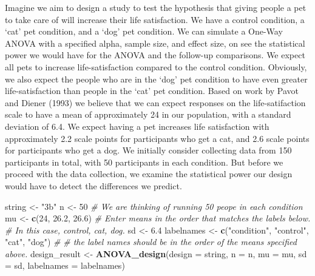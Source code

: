 \documentclass[]{book}
\newenvironment{Shaded}{\begin{snugshade}}{\end{snugshade}}
\newcommand{\CommentTok}[1]{\textcolor[rgb]{0.56,0.35,0.01}{\textit{#1}}}
\newcommand{\DataTypeTok}[1]{\textcolor[rgb]{0.13,0.29,0.53}{#1}}
\newcommand{\DecValTok}[1]{\textcolor[rgb]{0.00,0.00,0.81}{#1}}
\newcommand{\FloatTok}[1]{\textcolor[rgb]{0.00,0.00,0.81}{#1}}
\newcommand{\KeywordTok}[1]{\textcolor[rgb]{0.13,0.29,0.53}{\textbf{#1}}}
\newcommand{\NormalTok}[1]{#1}
\newcommand{\StringTok}[1]{\textcolor[rgb]{0.31,0.60,0.02}{#1}}
\begin{document}
Imagine we aim to design a study to test the hypothesis that giving people a pet to take care of will increase their life satisfaction. We have a control condition, a `cat' pet condition, and a `dog' pet condition. We can simulate a One-Way ANOVA with a specified alpha, sample size, and effect size, on see the statistical power we would have for the ANOVA and the follow-up comparisons. We expect all pets to increase life-satisfaction compared to the control condition. Obviously, we also expect the people who are in the `dog' pet condition to have even greater life-satisfaction than people in the `cat' pet condition. Based on work by Pavot and Diener (1993) we believe that we can expect responses on the life-satifaction scale to have a mean of approximately 24 in our population, with a standard deviation of 6.4. We expect having a pet increases life satisfaction with approximately 2.2 scale points for participants who get a cat, and 2.6 scale points for participants who get a dog. We initially consider collecting data from 150 participants in total, with 50 participants in each condition. But before we proceed with the data collection, we examine the statistical power our design would have to detect the differences we predict.

\begin{Shaded}
\begin{Highlighting}[]
\NormalTok{string <-}\StringTok{ "3b"}
\NormalTok{n <-}\StringTok{ }\DecValTok{50}
\CommentTok{# We are thinking of running 50 peope in each condition}
\NormalTok{mu <-}\StringTok{ }\KeywordTok{c}\NormalTok{(}\DecValTok{24}\NormalTok{, }\FloatTok{26.2}\NormalTok{, }\FloatTok{26.6}\NormalTok{)}
\CommentTok{# Enter means in the order that matches the labels below.}
\CommentTok{# In this case, control, cat, dog. }
\NormalTok{sd <-}\StringTok{ }\FloatTok{6.4}
\NormalTok{labelnames <-}\StringTok{ }\KeywordTok{c}\NormalTok{(}\StringTok{"condition"}\NormalTok{, }\StringTok{"control"}\NormalTok{, }\StringTok{"cat"}\NormalTok{, }\StringTok{"dog"}\NormalTok{) }\CommentTok{#}
\CommentTok{# the label names should be in the order of the means specified above.}
\NormalTok{design_result <-}\StringTok{ }\KeywordTok{ANOVA_design}\NormalTok{(}\DataTypeTok{design =}\NormalTok{ string,}
                   \DataTypeTok{n =}\NormalTok{ n, }
                   \DataTypeTok{mu =}\NormalTok{ mu, }
                   \DataTypeTok{sd =}\NormalTok{ sd, }
                   \DataTypeTok{labelnames =}\NormalTok{ labelnames)}
\end{Highlighting}
\end{Shaded}
\end{document}

